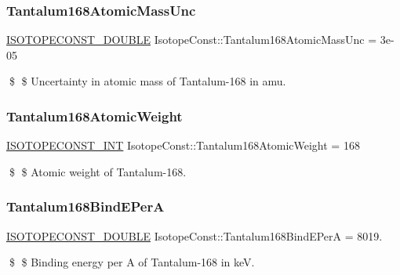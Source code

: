 \subsubsection{\texorpdfstring{Tantalum168\+Atomic\+Mass\+Unc}{Tantalum168AtomicMassUnc}}
{\footnotesize\ttfamily \mbox{\hyperlink{group___isotope_const-_macros_ga8f45a7272ce02c0b4c65c44636ed719a}{I\+S\+O\+T\+O\+P\+E\+C\+O\+N\+S\+T\+\_\+\+D\+O\+U\+B\+LE}} Isotope\+Const\+::\+Tantalum168\+Atomic\+Mass\+Unc = 3e-\/05}

\$ \$ Uncertainty in atomic mass of Tantalum-\/168 in amu. \mbox{\label{group___isotope_const-_tantalum-_ta168_gad2ce11cc8b168ad7ba2c19510e682b47}} 
\subsubsection{\texorpdfstring{Tantalum168\+Atomic\+Weight}{Tantalum168AtomicWeight}}
{\footnotesize\ttfamily \mbox{\hyperlink{group___isotope_const-_macros_ga5f18360b3e99483a35c32d789e62621c}{I\+S\+O\+T\+O\+P\+E\+C\+O\+N\+S\+T\+\_\+\+I\+NT}} Isotope\+Const\+::\+Tantalum168\+Atomic\+Weight = 168}

\$ \$ Atomic weight of Tantalum-\/168. \mbox{\label{group___isotope_const-_tantalum-_ta168_ga86605a44f488aa4fe93f2c07c52c0059}} 
\subsubsection{\texorpdfstring{Tantalum168\+Bind\+E\+PerA}{Tantalum168BindEPerA}}
{\footnotesize\ttfamily \mbox{\hyperlink{group___isotope_const-_macros_ga8f45a7272ce02c0b4c65c44636ed719a}{I\+S\+O\+T\+O\+P\+E\+C\+O\+N\+S\+T\+\_\+\+D\+O\+U\+B\+LE}} Isotope\+Const\+::\+Tantalum168\+Bind\+E\+PerA = 8019.}

\$ \$ Binding energy per A of Tantalum-\/168 in keV. \mbox{\label{group___isotope_const-_tantalum-_ta168_ga353f1cd314f0cc45e75d75c63b524229}} 
